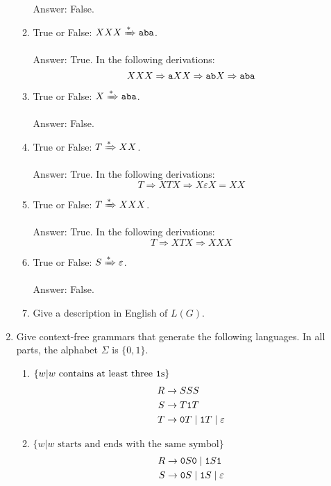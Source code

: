 \begin{enumerate}[font=\bfseries,label=2.\arabic*]
\begin{enumerate}[font=\bfseries,label=\alph*.]
    Answer: False.
    
    \item True or False: $XXX\xRightarrow{\ast} {\tt aba}$.
    
    Answer: True. In the following derivations: $$XXX\Rightarrow {\tt a}XX\Rightarrow {\tt a}{\tt b}X\Rightarrow {\tt a}{\tt b}{\tt a}$$
    
    \item True or False: $X\xRightarrow{\ast} {\tt aba}$.
    
    Answer: False.
    
    \item True or False: $T\xRightarrow{\ast} XX$.
    
    Answer: True. In the following derivations: $$T\Rightarrow XTX\Rightarrow X\varepsilon X=XX$$
    \item True or False: $T\xRightarrow{\ast} XXX$.
    
    Answer: True. In the following derivations: $$T\Rightarrow XTX\Rightarrow XXX$$
    \item True or False: $S\xRightarrow{\ast} \varepsilon$.
    
    Answer: False.
    \item Give a description in English of $L(G)$.
\end{enumerate}


\item Give context-free grammars that generate the following languages. In all parts, the alphabet $\Sigma$ is $\{0,1\}$.

\begin{enumerate}[font=\bfseries,label=\alph*.]
    \item $\{w| w\text{ contains at least three \texttt{1}s}\}$
    \begin{align*}
        R &\rightarrow SSS \\
        S &\rightarrow T{\tt 1}T \\
        T &\rightarrow {\tt 0}T \mid {\tt 1}T \mid \varepsilon
    \end{align*}
    
    \item $\{w| w\text{ starts and ends with the same symbol}\}$
    \begin{align*}
        R &\rightarrow {\tt 0}S{\tt 0} \mid {\tt 1}S{\tt 1} \\
        S &\rightarrow {\tt 0}S \mid {\tt 1}S \mid \varepsilon
    \end{align*}
    

\end{enumerate}
\end{enumerate}
